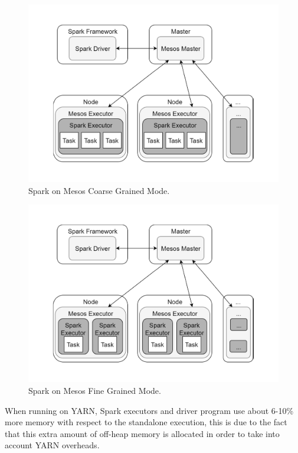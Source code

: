 \begin{figure}
	\centering
	\includegraphics[width=\columnwidth]{Images/spark_mesos_coarse_grained_mode.pdf}  
	\caption[Spark on Mesos Coarse Grained Mode]{Spark on Mesos Coarse Grained Mode.}
	\label{fig:sparkOnMesosCoarseGrainedMode}
\end{figure}
\begin{figure}
	\centering
	\includegraphics[width=\columnwidth]{Images/spark_mesos_fine_grained_mode.pdf}  
	\caption[Spark on Mesos Fine Grained Mode]{Spark on Mesos Fine Grained Mode.}
	\label{fig:sparkOnMesosFineGrainedMode}
\end{figure}

When running on YARN, Spark executors and driver program use
about 6-10\% more memory with respect to the standalone execution,
this is due to the fact that this extra amount of off-heap memory is
allocated in order to take into account YARN overheads.

